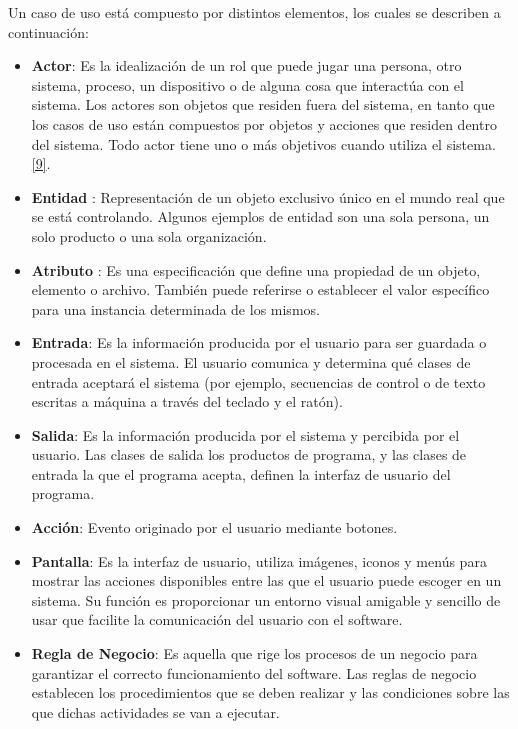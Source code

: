 Un caso de uso está compuesto por distintos elementos, los cuales se describen a continuación:
\begin{itemize}
\item \textbf{Actor}: Es la idealización de un rol que puede jugar una persona, otro sistema, proceso, un dispositivo o de alguna cosa que interactúa con el sistema. Los actores son objetos que residen fuera del sistema, en tanto que los casos de uso están compuestos por objetos y acciones que residen dentro del sistema. Todo actor tiene uno o más objetivos cuando utiliza el sistema.  \hyperlink{b09}{[9]}. 

\item \textbf{Entidad} : Representación de un objeto exclusivo único en el mundo real que se está controlando. Algunos ejemplos de entidad son una sola persona, un solo producto o una sola organización. 

\item \textbf{Atributo} : Es una especificación que define una propiedad de un objeto, elemento o archivo. También puede referirse o establecer el valor específico para una instancia determinada de los mismos.

\item \textbf{Entrada}: Es la información producida por el usuario para ser guardada o procesada en el sistema. El usuario comunica y determina qué clases de entrada aceptará el sistema (por ejemplo, secuencias de control o de texto escritas a máquina a través del teclado y el ratón).

\item \textbf{Salida}: Es la información producida por el sistema y percibida por el usuario. Las clases de salida los productos de programa, y las clases de entrada la que el programa acepta, definen la interfaz de usuario del programa.

\item \textbf{Acción}: Evento originado por el usuario mediante botones.

\item \textbf{Pantalla}: Es la interfaz de usuario, utiliza imágenes, iconos y menús para mostrar las acciones disponibles entre las que el usuario puede escoger en un sistema. Su función es proporcionar un entorno visual amigable y sencillo de usar que facilite la comunicación del usuario con el software.

\item \textbf{Regla de Negocio}: Es aquella que rige los procesos de un negocio para garantizar el correcto funcionamiento del software. Las reglas de negocio establecen los procedimientos que se deben realizar y las condiciones sobre las que dichas actividades se van a ejecutar.


\end{itemize}
